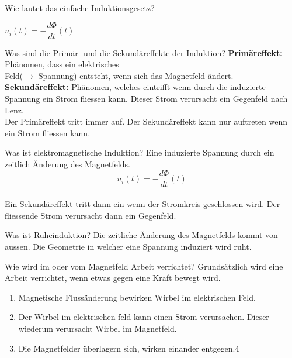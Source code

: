   
\begin{karte}{Wie lautet das einfache Induktionsgesetz?}
	\begin{center}
		\huge
		$u_{i}(t)=-\dfrac{d \Phi}{d t}(t)$
	\end{center}
\end{karte}

\begin{karte}{Was sind die Primär- und die Sekundäreffekte der Induktion?}
	\flushleft
	\textbf{Primäreffekt:} Phänomen, dass ein elektrisches \\Feld($\rightarrow$ Spannung) entsteht, wenn sich das Magnetfeld ändert.\\
	\textbf{Sekundäreffekt:} Phänomen, welches eintrifft wenn durch die induzierte Spannung ein Strom fliessen kann. Dieser Strom verursacht ein Gegenfeld nach Lenz.\\[10pt]
	Der Primäreffekt tritt immer auf. Der Sekundäreffekt kann nur auftreten wenn ein Strom fliessen kann.
\end{karte}

\begin{karte}{Was ist elektromagnetische Induktion?}
	Eine induzierte Spannung durch ein zeitlich Änderung des Magnetfelds.\\
	\begin{equation*}
		u_{i}(t)=-\dfrac{d \Phi}{d t}(t)
	\end{equation*}
	\\[10pt]
	Ein Sekundäreffekt tritt dann ein wenn der Stromkreis geschlossen wird. Der fliessende Strom verursacht dann ein Gegenfeld. 
\end{karte}

\begin{karte}{Was ist Ruheinduktion?}
	Die zeitliche Änderung des Magnetfelds kommt von aussen. Die Geometrie in welcher eine Spannung induziert wird ruht.
\end{karte}

\begin{karte}{Wie wird im oder vom Magnetfeld Arbeit verrichtet?}
	Grundsätzlich wird eine Arbeit verrichtet, wenn etwas gegen eine Kraft bewegt wird.
	\begin{enumerate}
		\item Magnetische Flussänderung bewirken Wirbel im elektrischen Feld.
		\item Der Wirbel im elektrischen feld kann einen Strom verursachen. Dieser wiederum verursacht Wirbel im Magnetfeld.
		\item Die Magnetfelder überlagern sich, wirken einander entgegen.4
	\end{enumerate}
\end{karte}

